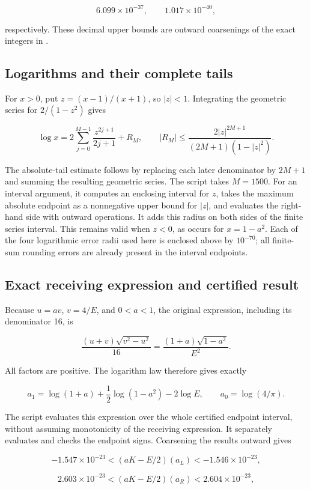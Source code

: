 \documentclass[11pt,a4paper]{article}
\begin{document}
\[
 6.099\times10^{-37},\qquad 1.017\times10^{-40},
\]

respectively. These decimal upper bounds are outward coarsenings of the exact integers in \texttt{}.

\subsection{Logarithms and their complete tails}

For $x>0$, put $z=(x-1)/(x+1)$, so $|z|<1$. Integrating the geometric series for $2/(1-z^2)$ gives

\[
 \log x=2\sum_{j=0}^{M-1}\frac{z^{2j+1}}{2j+1}+R_M,\qquad
 |R_M|\le\frac{2|z|^{2M+1}}{(2M+1)(1-|z|^2)}.
\]

The absolute-tail estimate follows by replacing each later denominator by $2M+1$ and summing the resulting geometric series. The script takes $M=1500$. For an interval argument, it computes an enclosing interval for $z$, takes the maximum absolute endpoint as a nonnegative upper bound for $|z|$, and evaluates the right-hand side with outward operations. It adds this radius on both sides of the finite series interval. This remains valid when $z<0$, as occurs for $x=1-a^2$. Each of the four logarithmic error radii used here is enclosed above by $10^{-70}$; all finite-sum rounding errors are already present in the interval endpoints.

\subsection{Exact receiving expression and certified result}

Because $u=av$, $v=4/E$, and $0<a<1$, the original expression, including its denominator 16, is

\[
 \frac{(u+v)\sqrt{v^2-u^2}}{16}
 =\frac{(1+a)\sqrt{1-a^2}}{E^2}.
\]

All factors are positive. The logarithm law therefore gives exactly

\[
 a_1=\log(1+a)+\frac12\log(1-a^2)-2\log E,
 \qquad a_0=\log(4/\pi).
\]

The script evaluates this expression over the whole certified endpoint interval, without assuming monotonicity of the receiving expression. It separately evaluates and checks the endpoint signs. Coarsening the results outward gives

\[
 -1.547\times10^{-23}<(aK-E/2)(a_L)<-1.546\times10^{-23},
\]

\[
 2.603\times10^{-23}<(aK-E/2)(a_R)<2.604\times10^{-23},
\]
\end{document}
